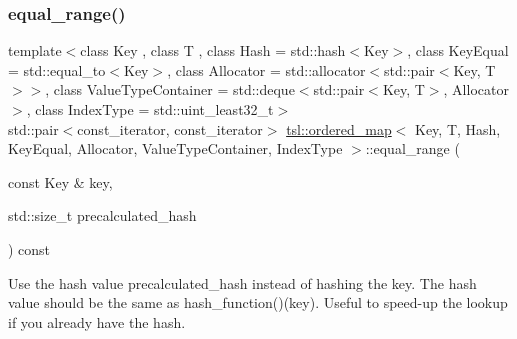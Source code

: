 \subsubsection{\texorpdfstring{equal\_range()}{equal\_range()}\hspace{0.1cm}{\footnotesize\ttfamily [2/6]}}
{\footnotesize\ttfamily template$<$class Key , class T , class Hash  = std\+::hash$<$\+Key$>$, class Key\+Equal  = std\+::equal\+\_\+to$<$\+Key$>$, class Allocator  = std\+::allocator$<$std\+::pair$<$\+Key, T$>$$>$, class Value\+Type\+Container  = std\+::deque$<$std\+::pair$<$\+Key, T$>$, Allocator$>$, class Index\+Type  = std\+::uint\+\_\+least32\+\_\+t$>$ \\
std\+::pair$<$const\+\_\+iterator, const\+\_\+iterator$>$ \mbox{\hyperlink{classtsl_1_1ordered__map}{tsl\+::ordered\+\_\+map}}$<$ Key, T, Hash, Key\+Equal, Allocator, Value\+Type\+Container, Index\+Type $>$\+::equal\+\_\+range (\begin{DoxyParamCaption}\item[{const Key \&}]{key,  }\item[{std\+::size\+\_\+t}]{precalculated\+\_\+hash }\end{DoxyParamCaption}) const\hspace{0.3cm}{\ttfamily [inline]}}





Use the hash value \textquotesingle{}precalculated\+\_\+hash\textquotesingle{} instead of hashing the key. The hash value should be the same as hash\+\_\+function()(key). Useful to speed-\/up the lookup if you already have the hash. \mbox{\label{classtsl_1_1ordered__map_ab168835676d025a969129df68922ed64}} 

